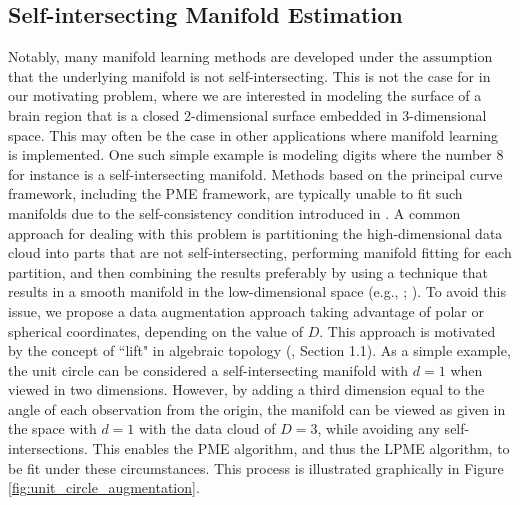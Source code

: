 \documentclass[11pt,reqno]{article}
\theoremstyle{definition}
\begin{document}
\subsection{Self-intersecting Manifold Estimation}\label{ss:selfInt}

Notably, many manifold learning methods are developed under the assumption that the underlying manifold is not self-intersecting. This is not the case for in our motivating problem, where we are interested in modeling the surface of a brain region that is a closed 2-dimensional surface embedded in 3-dimensional space. This may often be the case in other applications where manifold learning is implemented. One such simple example is modeling digits where the number 8 for instance is a self-intersecting manifold. Methods based on the principal curve framework, including the PME framework, are typically unable to fit such manifolds due to the self-consistency condition introduced in \cite{hastiePrincipalCurves1989}. A common approach for dealing with this problem is partitioning the high-dimensional data cloud into parts that are not self-intersecting, performing manifold fitting for each partition, and then combining the results preferably by using a technique that results in a smooth manifold in the low-dimensional space (e.g., \cite{mengPrincipalManifoldEstimation2021}; \cite{dunsonInferringManifoldsNoisy2022}). To avoid this issue, we propose a data augmentation approach taking advantage of polar or spherical coordinates, depending on the value of $D$. This approach is motivated by the concept of ``lift" in algebraic topology (\cite{hatcher2002algebraic}, Section 1.1). As a simple example, the unit circle can be considered a self-intersecting manifold with $d = 1$ when viewed in two dimensions. However, by adding a third dimension equal to the angle of each observation from the origin, the manifold can be viewed as given in the space with $d = 1$ with the data cloud of $D = 3$, while avoiding any self-intersections. This enables the PME algorithm, and thus the LPME algorithm, to be fit under these circumstances. This process is illustrated graphically in Figure \ref{fig:unit_circle_augmentation}.
\end{document}
